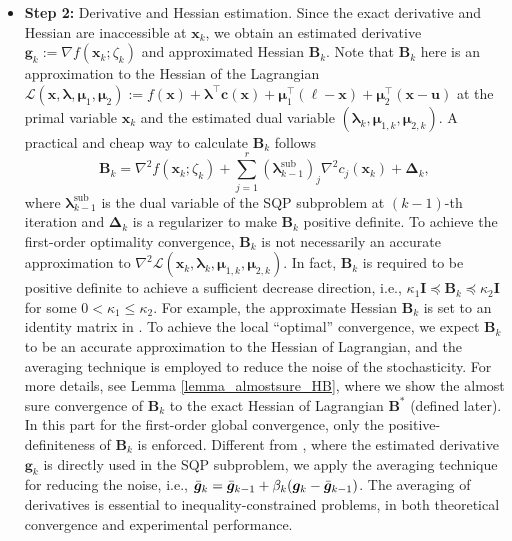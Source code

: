 \documentclass[aos]{imsart}
\numberwithin{equation}{section}
\theoremstyle{plain}
\begin{document}
\begin{itemize}
    \item \textbf{Step 2:} Derivative and Hessian estimation. Since the exact derivative and Hessian are inaccessible at $\bm{x}_k$, we obtain an estimated derivative $\bm{g}_k := \nabla f(\bm{x}_k; \zeta_k)$ and approximated Hessian $\bm{B}_k$. Note that $\bm{B}_k$ here is an approximation to the Hessian of the Lagrangian $\mathcal{L}(\bm{x},\bm{\lambda}, \bm{\mu}_1, \bm{\mu}_2) := f(\bm{x}) + \bm{\lambda}^{\top} \bm{c}(\bm{x}) +  \bm{\mu}_1^{\top}\left(\bm{\ell} - \bm{x} \right) + \bm{\mu}_2^{\top}\left(\bm{x} - \bm{u} \right)$ at the primal variable $\bm{x}_k$ and the estimated dual variable $\left(\bm{\lambda}_{k}, \bm{\mu}_{1,k}, \bm{\mu}_{2,k} \right)$. A practical and cheap way to calculate $\bm{B}_k$ follows
    \begin{equation}
        \bm{B}_k = \nabla^2 f(\bm{x}_k;\zeta_k) + \sum_{j=1}^{r}(\bm{\lambda}_{k-1}^{\text{sub}})_{j} \nabla^2 c_j(\bm{x}_k) + \bm{\Delta}_k,
    \end{equation}
    where $\bm{\lambda}_{k-1}^{\text{sub}}$ is the dual variable of the SQP subproblem at $(k-1)$-th iteration and $\bm{\Delta}_k$ is a regularizer to make $\bm{B}_k$ positive definite.
    To achieve the first-order optimality convergence, $\bm{B}_k$ is not necessarily an accurate approximation to $\nabla^2 \mathcal{L}(\bm{x}_k, \bm{\lambda}_{k}, \bm{\mu}_{1,k}, \bm{\mu}_{2,k})$. In fact, $\bm{B}_k$ is required to be positive definite to achieve a sufficient decrease direction, i.e.,  $\kappa_1 \mathbf{I} \preceq \bm{B}_k \preceq \kappa_2 \mathbf{I}$ for some $0<\kappa_1 \leq \kappa_2$. For example, the approximate Hessian $\bm{B}_k$ is set to an identity matrix in \cite{curtis2023sequential}. To achieve the local ``optimal'' convergence, we expect $\bm{B}_k$ to be an accurate approximation to the Hessian of Lagrangian, and the averaging technique is employed to reduce the noise of the stochasticity. For more details, see Lemma \ref{lemma_almostsure_HB}, where we show the almost sure convergence of $\bm{B}_k$ to the exact Hessian of Lagrangian $\bm{B}^{*}$ (defined later).
In this part for the first-order global convergence, only the positive-definiteness of $\bm{B}_k$ is enforced. Different from \cite{curtis2023sequential}, where the estimated derivative $\bm{g}_k$ is directly used in the SQP subproblem, we apply the averaging technique for reducing the noise, i.e., $\Bar{\bm{g}}_k = \Bar{\bm{g}}_{k-1} + \beta_k (\bm{g}_k - \Bar{\bm{g}}_{k-1})$. 
The averaging of derivatives is essential to inequality-constrained problems, in both theoretical convergence and experimental performance. 

\end{itemize}
\end{document}
